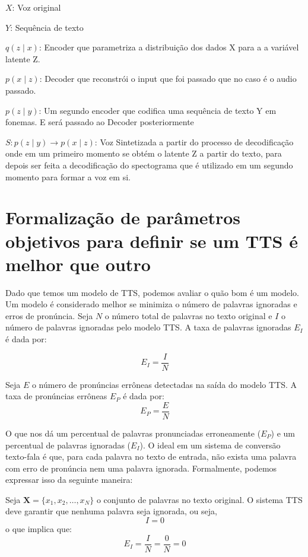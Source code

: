 \documentclass{article}
\begin{document}
			$X$: Voz original
			
			$Y$: Sequência de texto
			
			$q(z \mid x)$: Encoder que parametriza a distribuição dos dados X para a a variável latente Z.
			
			$p(x \mid z)$: Decoder que reconstrói o input que foi passado que no caso é o audio passado.
				
			$p(z \mid y)$: Um segundo encoder que codifica uma sequência de texto Y em fonemas. E será passado ao Decoder posteriormente
			
			$S: p(z \mid y) \rightarrow  p(x \mid z)$: Voz Sintetizada a partir do processo de decodificação onde em um primeiro momento se obtém o latente Z a partir do texto, para depois ser feita a decodificação do spectograma que é utilizado em um segundo momento para formar a voz em si.
		


\section{Formalização de parâmetros objetivos para definir se um TTS é melhor que outro}
Dado que temos um modelo de TTS, podemos avaliar o quão bom é um modelo. Um modelo é considerado melhor se minimiza o número de palavras ignoradas e erros de pronúncia. Seja \( N \) o número total de palavras no texto original e \( I \) o número de palavras ignoradas pelo modelo TTS. A taxa de palavras ignoradas \( E_I \) é dada por:

\begin{equation}
E_I = \frac{I}{N}
\end{equation}

Seja \( E \) o número de pronúncias errôneas detectadas na saída do modelo TTS. A taxa de pronúncias errôneas \( E_P \) é dada por:
\begin{equation}
E_P = \frac{E}{N}
\end{equation}

O que nos dá um percentual de palavras pronunciadas erroneamente (\( E_P \)) e um percentual de palavras ignoradas (\( E_I \)). O ideal em um sistema de conversão texto-fala é que, para cada palavra no texto de entrada, não exista uma palavra com erro de pronúncia nem uma palavra ignorada. Formalmente, podemos expressar isso da seguinte maneira:

Seja \( \mathbf{X} = \{x_1, x_2, \ldots, x_N\} \) o conjunto de palavras no texto original. O sistema TTS deve garantir que nenhuma palavra seja ignorada, ou seja,
\begin{equation}
I = 0
\end{equation}
o que implica que:
\begin{equation}
E_I = \frac{I}{N} = \frac{0}{N} = 0
\end{equation}
\end{document}
